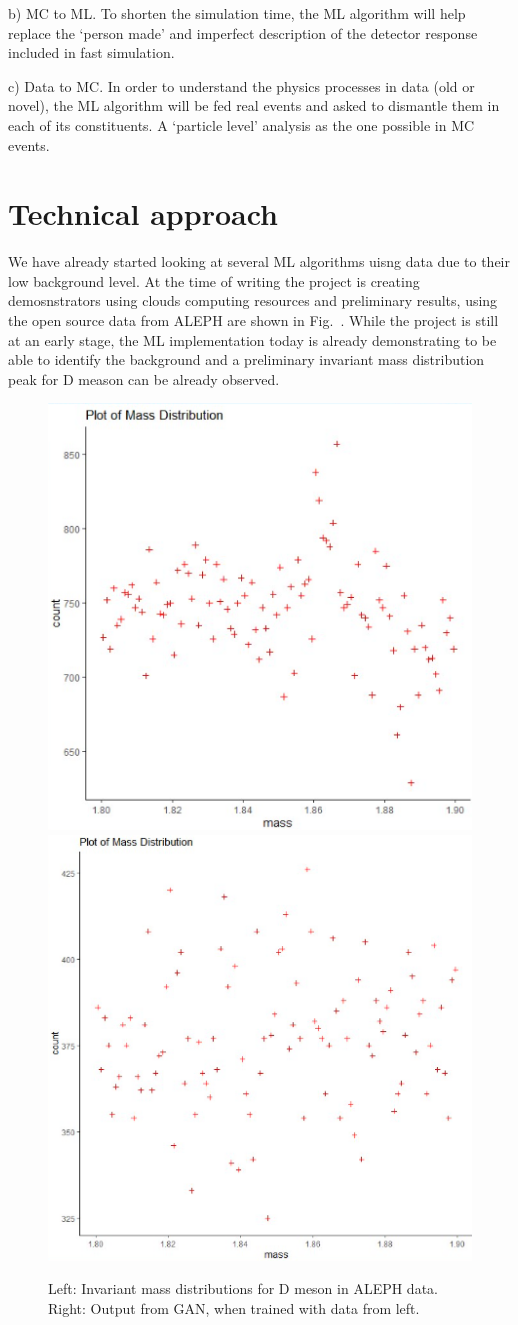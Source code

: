 b) MC to ML. To shorten the simulation time, the ML algorithm will help replace the `person made' and imperfect description of the detector response included in fast simulation.  

c) Data to MC. In order to understand the physics processes in data (old or novel), the ML algorithm will be fed real events and asked to dismantle them in each of its constituents. A `particle level' analysis as the one possible in MC events. 

\section{Technical approach}
We have already started looking at several ML algorithms uisng \eecol data due to their low background level. At the time of writing the project is creating demosnstrators using clouds computing resources and preliminary results, using the open source data from ALEPH are shown in Fig.~. While the project is still at an early stage, the ML implementation today is already demonstrating to be able to identify the background and a preliminary invariant mass distribution peak for D meason can be already observed. 


\begin{figure}[!ht]
\begin{center}
\includegraphics[width=.4\textwidth]{figures/Fig1_massDFromDataAleph}
\includegraphics[width=.4\textwidth]{figures/Fig1_massDFromGAN100kEntry}
\caption{Left: Invariant mass distributions for D meson in \eecol ALEPH data. Right: Output from GAN, when trained with data from left. }
\label{fig:concept}
\end{center}
\end{figure}

\clearpage


